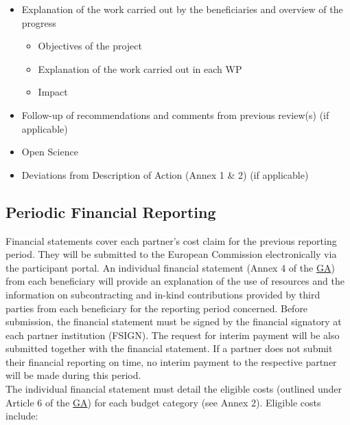 \documentclass[
]{article}
\providecommand{\tightlist}{%
  \setlength{\itemsep}{0pt}\setlength{\parskip}{0pt}}
\begin{document}
\begin{itemize}
\item
  Explanation of the work carried out by the beneficiaries and overview of the progress

  \begin{itemize}
  \tightlist
  \item
    Objectives of the project\\
  \item
    Explanation of the work carried out in each WP\\
  \item
    Impact
  \end{itemize}
\item
  Follow-up of recommendations and comments from previous review(s) (if applicable)\\
\item
  Open Science\\
\item
  Deviations from Description of Action (Annex 1 \& 2) (if applicable)
\end{itemize}

\hypertarget{periodic-financial-reporting}{%
\subsection{Periodic Financial Reporting}\label{periodic-financial-reporting}}

Financial statements cover each partner's cost claim for the previous reporting period. They will be submitted to the European Commission electronically via the participant portal. An individual financial statement (Annex 4 of the \href{https://charitede.sharepoint.com/:f:/r/sites/iRISE/Shared\%20Documents/General/Grant\%20Agreement/AMD-101094853-4_Nov2023?csf=1\&web=1\&e=IRbwUs}{GA}) from each beneficiary will provide an explanation of the use of resources and the information on subcontracting and in-kind contributions provided by third parties from each beneficiary for the reporting period concerned. Before submission, the financial statement must be signed by the financial signatory at each partner institution (FSIGN). The request for interim payment will be also submitted together with the financial statement. If a partner does not submit their financial reporting on time, no interim payment to the respective partner will be made during this period.\\
The individual financial statement must detail the eligible costs (outlined under Article 6 of the \href{https://charitede.sharepoint.com/:f:/r/sites/iRISE/Shared\%20Documents/General/Grant\%20Agreement/AMD-101094853-4_Nov2023?csf=1\&web=1\&e=IRbwUs}{GA}) for each budget category (see Annex 2). Eligible costs include:
\end{document}
